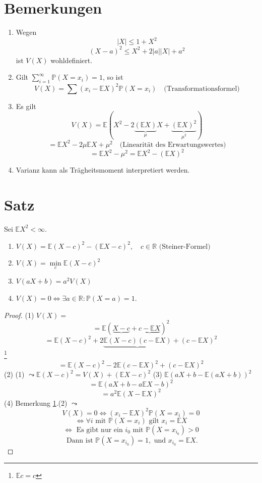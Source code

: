 \documentclass[a4paper,11pt,notitlepage]{report}
\newcommand{\R}{{\ensuremath{\mathbb{R}}}}
\newcommand{\Prim}{{\ensuremath{\mathbb{P}}}}
\newcommand{\E}{{\ensuremath{\mathbb{E}}}}
\begin{document}
\section{Bemerkungen}
\label{bem112}
\begin{enumerate}
	\item Wegen $$|X| \leq 1 + X^2$$
		$$(X-a)^2 \leq X^2 + 2 |a| |X| + a^2$$
		ist $V(X)$ wohldefiniert.
	\item Gilt $\sum\limits_{i=1}^\infty{\Prim(X=x_i)} = 1$, so ist
		$$V(X) = \sum{(x_i - \E X)^2 \Prim(X=x_i)} \quad \text{(Transformationsformel)}$$
	\item Es gilt 
		$$V(X) = \E (X^2-2 \underbrace{(\E X)}_{\mu} X + \underbrace{(\E X)^2}_{\mu ^2})$$
		$$= \E X^2 - 2 \mu \E X + \mu ^2 \quad \text{(Linearität des Erwartungswertes)}$$
		$$= \E X^2 - \mu ^2 = \E X^2 - (\E X)^2$$
	\item Varianz kann als Trägheitsmoment interpretiert werden.
\end{enumerate}

\section{Satz}
Sei $\E X^2 < \infty$.
\begin{enumerate}
	\item $V(X) = \E(X-c)^2 - (\E X - c)^2, \quad c \in \R \text{ (Steiner-Formel)}$
	\item $V(X) = \min\limits_{c}{ \E(X-c)^2}$
	\item $V(aX + b) = a^2 V(X)$
	\item $V(X) = 0 \Leftrightarrow \exists a \in \R \colon \Prim(X=a) = 1.$
\end{enumerate}

\begin{proof}
	(1) $V(X)=$
		$$= \E ( \underbrace{X-c} + \underbrace{c-\E X})^2$$
		$$= \E(X-c)^2 + 2 \underbrace{\E (X-c)(c- \E X)} + (c - \E X)^2$$ \footnote{$\E c = c$}
		$$= \E(X-c)^2 - 2 \E (c - \E X)^2 + (c - \E X)^2$$
	(2) (1) $\leadsto \E (X-c)^2 = V(X) + (\E X -c)^2$
	\newline
	(3) $\E (aX+b - \E (aX + b))^2$
	$$= \E (aX + b - a \E X - b)^2$$
	$$= a^2 \E (X - \E X)^2$$
	(4) Bemerkung \ref{bem112}.(2) $\leadsto$ 
	$$V(X) = 0 \Leftrightarrow (x_i - \E X)^2 \Prim(X=x_i)=0$$
	$$\Leftrightarrow \forall i \text{ mit } \Prim(X= x_i) \text{ gilt } x_i = \E X$$
	$$\Leftrightarrow \text{ Es gibt nur ein $i_0$ mit } \Prim(X=x_{i_0})>0$$
	$$ \text{ Dann ist } \Prim(X=x_{i_0}) = 1, \text{ und } x_{i_0} = \E X.$$
\end{proof}
\end{document}
